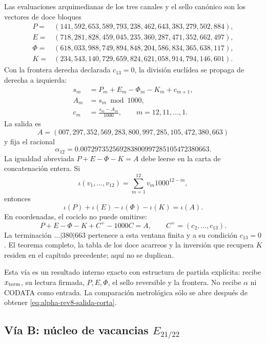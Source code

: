 Las evaluaciones arquimedianas de los tres canales y el sello canónico son
los vectores de doce bloques
\[
\begin{aligned}
P={}&(141,592,653,589,793,238,462,643,383,279,502,884),\\
E={}&(718,281,828,459,045,235,360,287,471,352,662,497),\\
\Phi={}&(618,033,988,749,894,848,204,586,834,365,638,117),\\
K={}&(234,543,140,729,659,824,621,058,914,794,146,601).
\end{aligned}
\]
Con la frontera derecha declarada \(c_{13}=0\), la división euclídea se
propaga de derecha a izquierda:
\begin{equation}
\begin{aligned}
 s_m&=P_m+E_m-\Phi_m-K_m+c_{m+1},\\
 A_m&=s_m\bmod 1000,\\
 c_m&=\frac{s_m-A_m}{1000},
 \qquad m=12,11,\ldots,1.
\end{aligned}
\label{eq:alpha-rev8-via-entera}
\end{equation}
La salida es
\[
 A=(007,297,352,569,283,800,997,285,105,472,380,663)
\]
y fija el racional
\begin{equation}
 \alpha_{12}
 =0.007297352569283800997285105472380663.
 \label{eq:alpha-rev8-salida-corta}
\end{equation}
La igualdad abreviada \(P+E-\Phi-K=A\) debe leerse en la carta de
concatenación entera. Si
\[
 \iota(v_1,\ldots,v_{12})
 =\sum_{m=1}^{12}v_m1000^{12-m},
\]
entonces
\begin{equation}
 \boxed{\iota(P)+\iota(E)-\iota(\Phi)-\iota(K)=\iota(A)}.
 \label{eq:alpha-rev8-identidad-concatenada}
\end{equation}
En coordenadas, el cociclo no puede omitirse:
\[
 P+E-\Phi-K+C^+-1000C=A,
 \qquad C^+=(c_2,\ldots,c_{13}).
\]
La terminación \(\ldots|380|663\) pertenece a esta ventana finita y a su
condición \(c_{13}=0\). El teorema completo, la tabla de los doce acarreos y
la inversión que recupera \(K\) residen en el capítulo precedente; aquí no se
duplican.

Esta vía es un resultado interno exacto con estructura de partida explícita:
recibe \(x_{\rm term}\), su lectura firmada, \(P,E,\Phi\), el sello reversible
y la frontera. No recibe \(\alpha\) ni CODATA como entrada. La comparación
metrológica sólo se abre después de obtener \eqref{eq:alpha-rev8-salida-corta}.

\subsection{Vía B: núcleo de vacancias \texorpdfstring{\(E_{21/22}\)}{E21/22}}

